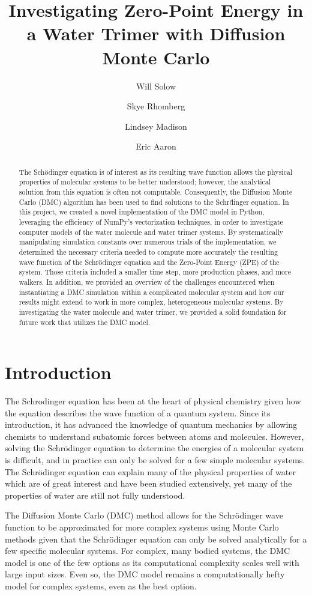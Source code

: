\documentclass[journal=jacsat,manuscript=article]{achemso}
\author{Will Solow}
\author{Skye Rhomberg}
\author{Lindsey Madison}
\author{Eric Aaron}
\affiliation[Colby College]
{Department of Computer Science, Colby College, Waterville, ME}
\title{Investigating Zero-Point Energy in a Water Trimer with Diffusion Monte Carlo}
\begin{document}
\begin{abstract}
The Sch\"odinger equation is of interest as its resulting wave function allows the physical properties of molecular systems to be better understood; however, the analytical solution from this equation is often not computable. Consequently, the Diffusion Monte Carlo (DMC) algorithm has been used to find solutions to the Schr\"dinger equation.  In this project, we created a novel implementation of the DMC model in Python, leveraging the efficiency of NumPy’s vectorization techniques, in order to investigate computer models of the water molecule and water trimer systems. By systematically manipulating simulation constants over numerous trials of the implementation, we determined the necessary criteria needed to compute more accurately the resulting wave function of the Schr\"odinger equation and the Zero-Point Energy (ZPE) of the system. Those criteria included a smaller time step, more production phases, and more walkers. In addition, we provided an overview of the challenges encountered when instantiating a DMC simulation within a complicated molecular system and how our results might extend to work in more complex, heterogeneous molecular systems. By investigating the water molecule and water trimer, we provided a solid foundation for future work that utilizes the DMC model.
\end{abstract}


\section{Introduction}

The Schrodinger\cite{Schrodinger1926} equation has been at the heart of physical chemistry given how the equation describes the wave function of a quantum system. Since its introduction, it has advanced the knowledge of quantum mechanics by allowing chemists to understand subatomic forces between atoms and molecules. However, solving the Schr\"odinger equation to determine the energies of a molecular system is difficult, and in practice can only be solved for a few simple molecular systems. The Schr\"odinger equation can explain many of the physical properties of water which are of great interest and have been studied extensively\cite{Goldman2004,Gillan2013}, yet many of the properties of water are still not fully understood.\cite{Liu1996}

The Diffusion Monte Carlo\cite{Anderson1975} (DMC) method allows for the Schr\"odinger wave function to be approximated for more complex systems using Monte Carlo methods given that the Schr\"odinger equation can only be solved analytically for a few specific molecular systems.\cite{Faber1996,Pang2014} For complex, many bodied systems\cite{Lee2019,Veil2001}, the DMC model is one of the few options as its computational complexity scales well with large input sizes. Even so, the DMC model remains a computationally hefty model for complex systems, even as the best option. 
	
\end{document}
